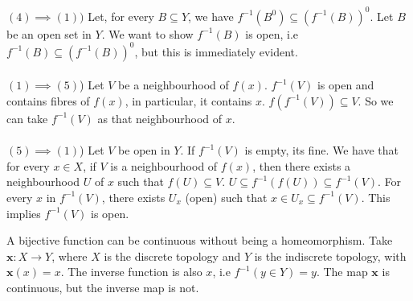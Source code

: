 \documentclass[main.tex]{subfiles}
\begin{document}
{\\\\ $(4)\implies (1)) $ Let, for every $B \subseteq Y$, we have $f^{-1}(B^0) \subseteq (f^{-1}(B))^0$. Let $B$ be an open set in $Y$. We want to show $f^{-1}(B)$ is open, i.e $f^{-1}(B) \subseteq (f^{-1}(B))^0$, but this is immediately evident.
\\\\ $(1)\implies (5)$) Let $V$ be a neighbourhood of $f(x)$. $f^{-1}(V)$ is open and contains fibres of $f(x)$, in particular, it contains $x$. $f(f^{-1}(V))\subseteq V$. So we can take $f^{-1}(V)$ as that neighbourhood of $x$.
\\\\ $(5)\implies (1)$) Let $V$ be open in $Y$. If $f^{-1}(V)$ is empty, its fine. We have that for every $x \in X$, if $V$ is a neighbourhood of $f(x)$, then there exists a neighbourhood $U$ of $x$ such that $f(U)\subseteq V$. $U \subseteq f^{-1}(f(U)) \subseteq f^{-1}(V)$. For every $x$ in $f^{-1}(V)$, there exists $U_x$ (open) such that $x \in U_x \subseteq f^{-1}(V)$. This implies $f^{-1}(V)$ is open. }
\begin{example}
    A bijective function can be continuous without being a homeomorphism. Take $\textbf{x}:X \to Y$, where $X$ is the discrete topology and $Y$ is the indiscrete topology, with $\textbf{x} (x)=x$. The inverse function is also $x$, i.e $f^{-1}(y \in Y)=y$. The map $\textbf{x}$ is continuous, but the inverse map is not. 
\end{example}
\end{document}
